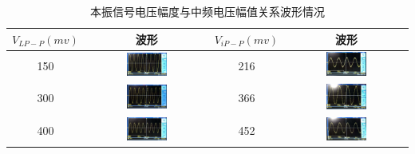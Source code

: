 \documentclass[12pt]{article}%
\numberwithin{equation}{section}
\begin{document}
\begin{enumerate}
\begin{table}[htbp]
\centering
\caption{本振信号电压幅度与中频电压幅值关系波形情况}
\label{tab:ajk3}
\begin{tabular}{|c|c|c|c|}
\hline
$V_{LP-P}(mv)$ & 波形 & $V_{iP-P}(mv)$ & 波形 \\ \hline
150            &   \includegraphics[width=0.35\textwidth]{gaopin3/gaopin319.jpg}   & 216            & \includegraphics[width=0.35\textwidth]{gaopin3/gaopin321.jpg}   \\ \hline
300            & \includegraphics[width=0.35\textwidth]{gaopin3/gaopin305.jpg}   & 366            &  \includegraphics[width=0.35\textwidth]{gaopin3/gaopin308.jpg}  \\ \hline
400            &  \includegraphics[width=0.35\textwidth]{gaopin3/gaopin312.jpg}  & 452            & \includegraphics[width=0.35\textwidth]{gaopin3/gaopin304.jpg}   \\ \hline

\end{tabular}
\end{table}
\end{enumerate}
\end{document}
